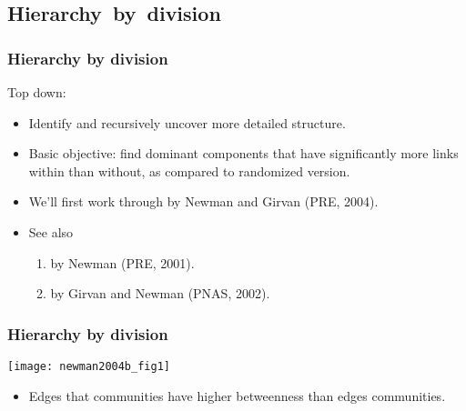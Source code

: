 \subsection{Hierarchy\ by\ division}

\begin{frame}
  \frametitle{Hierarchy by division}

  \begin{block}{Top down:}
    \begin{itemize}
    \item<1-> 
      Identify  and recursively
      uncover more detailed structure.
    \item<2->
      \alert{Basic objective:} find dominant components
      that have significantly more links within than without, as compared
      to randomized version.
    \item<3->
      We'll first work through 
      by Newman and Girvan (PRE, 2004).\cite{newman2004b}
    \item<4->
      See also 
      \begin{enumerate}
      \item<4->
        by Newman (PRE, 2001).\cite{newman2001d,newman2006e}
      \item<5-> 
        by Girvan and Newman (PNAS, 2002).\cite{girvan2002a} 
      \end{enumerate}
    \end{itemize}
    
  \end{block}

\end{frame}

\begin{frame}
  \frametitle{Hierarchy by division}

  \texttt{[image: newman2004b\_fig1]}

  \begin{itemize}
  \item<1-> 
    Edges that  communities have 
    \alert{higher betweenness} 
    than edges  communities.
  \end{itemize}

\end{frame}

